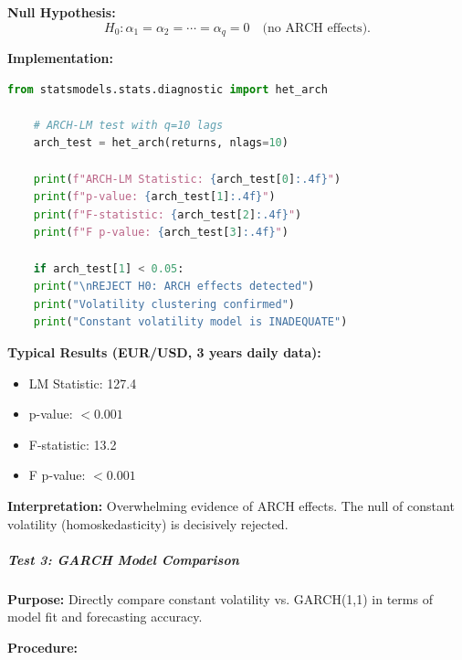 \textbf{Null Hypothesis:}
\begin{equation}
	H_0: \alpha_1 = \alpha_2 = \cdots = \alpha_q = 0 \quad \text{(no ARCH effects)}.
\end{equation}

\textbf{Implementation:}

\begin{lstlisting}[language=Python, caption={Engle's ARCH-LM Test}]
	from statsmodels.stats.diagnostic import het_arch
	
	# ARCH-LM test with q=10 lags
	arch_test = het_arch(returns, nlags=10)
	
	print(f"ARCH-LM Statistic: {arch_test[0]:.4f}")
	print(f"p-value: {arch_test[1]:.4f}")
	print(f"F-statistic: {arch_test[2]:.4f}")
	print(f"F p-value: {arch_test[3]:.4f}")
	
	if arch_test[1] < 0.05:
	print("\nREJECT H0: ARCH effects detected")
	print("Volatility clustering confirmed")
	print("Constant volatility model is INADEQUATE")
\end{lstlisting}

\textbf{Typical Results (EUR/USD, 3 years daily data):}

\begin{itemize}
	\item LM Statistic: 127.4
	\item p-value: $< 0.001$
	\item F-statistic: 13.2
	\item F p-value: $< 0.001$
\end{itemize}

\textbf{Interpretation:} Overwhelming evidence of ARCH effects. The null of constant volatility (homoskedasticity) is decisively rejected.

\subparagraph{Test 3: GARCH Model Comparison}

\textbf{Purpose:} Directly compare constant volatility vs. GARCH(1,1) in terms of model fit and forecasting accuracy.

\textbf{Procedure:}

